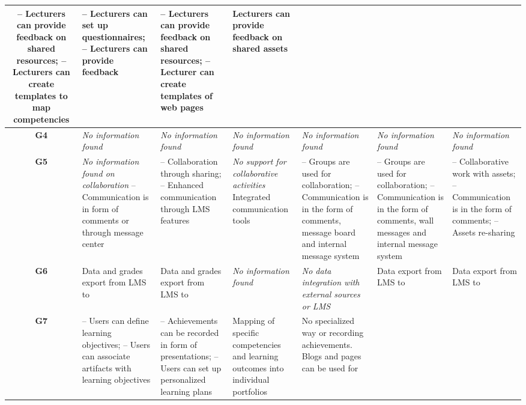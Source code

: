 \begin{sidewaystable}
\begin{tabular}{|c|p{3.25cm}|p{3.25cm}|p{3.25cm}|p{3.25cm}|p{3.25cm}|p{3.25cm}|}
	-- Lecturers can provide feedback on shared resources; \newline -- Lecturers
	can create templates to map competencies & 
	-- Lecturers can set up questionnaires; \newline -- Lecturers can provide
	feedback & 
	-- Lecturers can provide feedback on shared resources; \newline -- Lecturer
	can create templates of web pages & 
	Lecturers can provide feedback on shared assets	\\	\hline 
	\textbf{G4} & \textit{No information found} & \textit{No information found} &
	\textit{No information found} & \textit{No information found} & 
	\textit{No information found} & \textit{No information found} \\ \hline 
	\textbf{G5} & 
	\textit{No information found on collaboration} \newline -- Communication is
	in form of comments or through message center & 
	-- Collaboration through sharing; \newline -- Enhanced communication through
	LMS features & 
	\textit {No support for collaborative activities} \newline Integrated
	communication tools & 
	-- Groups are used for collaboration; \newline --	Communication is in 
	the form of comments, message board and internal message system & 
	-- Groups are used for collaboration; \newline -- Communication is
	in the form of comments, wall messages and internal message system & 
	-- Collaborative work with assets; \newline -- Communication is
	in the form of comments; \newline -- Assets re-sharing \\
	\hline 
	\textbf{G6} & 
	Data and grades export from LMS to \ep & 
	Data and grades export from LMS to \ep & 
	\textit{No information found} & 
	\textit{No data integration with external sources or LMS} & 
	Data export from LMS to \ep & 
	Data export from LMS to \ep \\ \hline
	\textbf{G7} & 
	-- Users can define learning objectives; \newline -- Users can
	associate artifacts with learning objectives & 
	-- Achievements can be recorded in form of presentations; \newline -- Users can
	set up personalized learning plans & 
	Mapping of specific competencies and learning outcomes into individual
	portfolios & 
	No specialized way or recording achievements. Blogs and pages can be used for

\end{tabular}
\end{sidewaystable}
